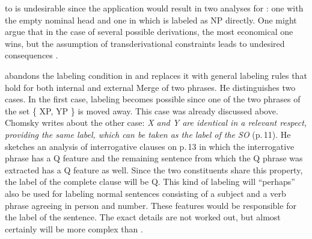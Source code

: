  to  is undesirable since the application would result in
two analyses for : one with the empty nominal head and one in which
 is labeled as NP directly. One might argue that in the case of several possible derivations, the most
economical one wins, but the assumption of transderivational constraints leads to undesired
consequences \citep[Section~5]{Pullum2013a}.

\citet{Chomsky2013a} abandons the labeling condition in  and replaces it with general
labeling rules that hold for both internal and external Merge of two phrases. He distinguishes two
cases. In the first case, labeling becomes possible since one of the two phrases of the set \{ XP,
YP \} is moved away. This case was already discussed above. Chomsky writes about the other case: \emph{X and Y are identical in a relevant respect, providing the same label, which can be
  taken as the label of the SO} (p.\,11). He sketches an analysis of interrogative clauses on
  p.\,13 in which the interrogative phrase has a Q feature and the remaining sentence from which the
  Q phrase was extracted has a Q feature as well. Since the two constituents share this property, the
  label of the complete clause will be Q. This kind of labeling will ``perhaps'' also be used for
  labeling normal sentences consisting of a subject and a verb phrase agreeing in person and
  number. These features would be responsible for the label of the sentence. The exact details are
  not worked out, but almost certainly will be more complex than .

